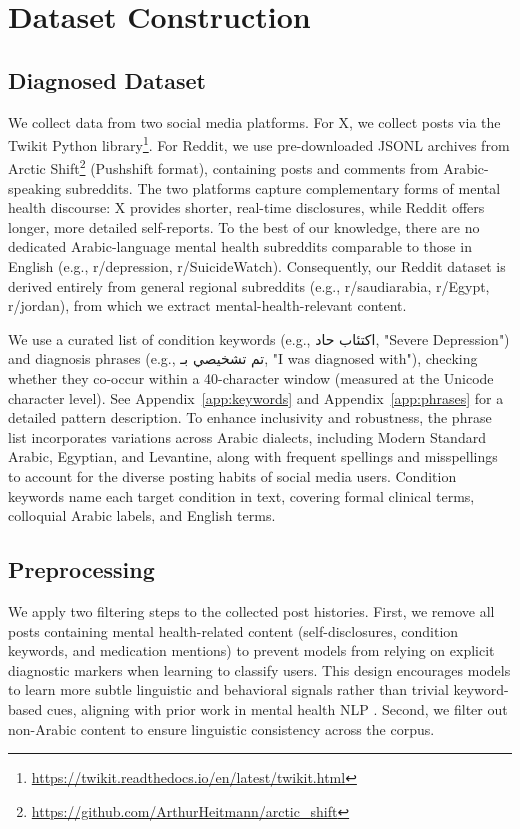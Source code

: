 \documentclass[11pt]{article}
\begin{document}
\section{Dataset Construction}
\label{subsec:data_source}

\subsection{Diagnosed Dataset}

We collect data from two social media platforms. For X, we collect posts via the Twikit Python library\footnote{\url{https://twikit.readthedocs.io/en/latest/twikit.html}}. For Reddit, we use pre-downloaded JSONL archives from Arctic Shift\footnote{\url{https://github.com/ArthurHeitmann/arctic_shift}} (Pushshift format), containing posts and comments from Arabic-speaking subreddits. The two platforms capture complementary forms of mental health discourse: X provides shorter, real-time disclosures, while Reddit offers longer, more detailed self-reports. To the best of our knowledge, there are no dedicated Arabic-language mental health subreddits comparable to those in English (e.g., r/depression, r/SuicideWatch). Consequently, our Reddit dataset is derived entirely from general regional subreddits (e.g., r/saudiarabia, r/Egypt, r/jordan), from which we extract mental-health-relevant content.

We use a curated list of condition keywords (e.g., \foreignlanguage{arabic}{اكتئاب حاد}, "Severe Depression") and diagnosis phrases (e.g., \foreignlanguage{arabic}{تم تشخيصي بـ}, "I was diagnosed with"), checking whether they co-occur within a 40-character window (measured at the Unicode character level). See Appendix~\ref{app:keywords} and Appendix~\ref{app:phrases} for a detailed pattern description. To enhance inclusivity and robustness, the phrase list incorporates variations across Arabic dialects, including Modern Standard Arabic, Egyptian, and Levantine, along with frequent spellings and misspellings to account for the diverse posting habits of social media users. Condition keywords name each target condition in text, covering formal clinical terms, colloquial Arabic labels, and English terms.

\subsection{Preprocessing}

We apply two filtering steps to the collected post histories. First, we remove all posts containing mental health-related content (self-disclosures, condition keywords, and medication mentions) to prevent models from relying on explicit diagnostic markers when learning to classify users. This design encourages models to learn more subtle linguistic and behavioral signals rather than trivial keyword-based cues, aligning with prior work in mental health NLP \cite{cohan-etal-2018-smhd}. Second, we filter out non-Arabic content to ensure linguistic consistency across the corpus.
\end{document}
